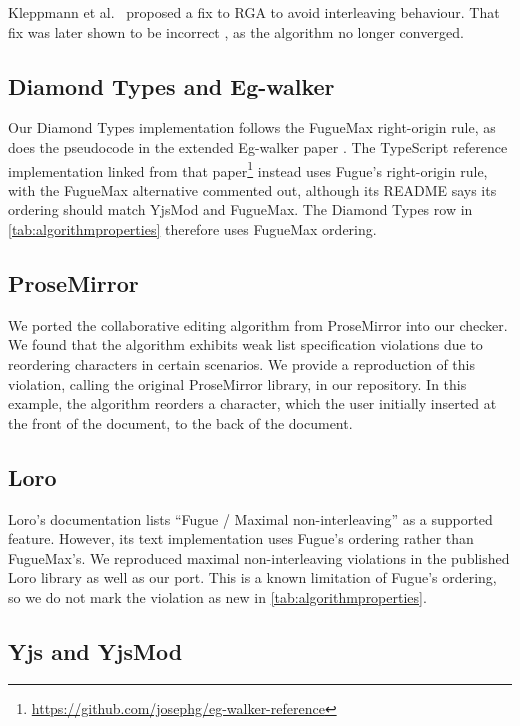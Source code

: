 \documentclass[sigplan,10pt,review,anonymous]{acmart}
\begin{document}
Kleppmann et al.~\cite{Kleppmann2019} proposed a fix to RGA to avoid interleaving behaviour. That fix was later shown to be incorrect \cite{Weidner2025Fugue}, as the algorithm no longer converged.

\subsection{Diamond Types and Eg-walker}

Our Diamond Types implementation follows the FugueMax right-origin rule, as does the pseudocode in the extended Eg-walker paper \cite{Gentle2025}. The TypeScript reference implementation linked from that paper\footnote{\url{https://github.com/josephg/eg-walker-reference}} instead uses Fugue's right-origin rule, with the FugueMax alternative commented out, although its README says its ordering should match YjsMod and FugueMax. The Diamond Types row in \autoref{tab:algorithmproperties} therefore uses FugueMax ordering.

\subsection{ProseMirror}

We ported the collaborative editing algorithm from ProseMirror \cite{Haverbeke2015} into our checker. We found that the algorithm exhibits weak list specification violations due to reordering characters in certain scenarios. We provide a reproduction of this violation, calling the original ProseMirror library, in our repository. In this example, the algorithm reorders a character, which the user initially inserted at the front of the document, to the back of the document.

\subsection{Loro} \label{sec:loroimplementation}

Loro's documentation \cite{Loro2026} lists ``Fugue / Maximal non-inter\-leaving'' as a supported feature. However, its text implementation uses Fugue's ordering rather than FugueMax's. We reproduced maximal non-interleaving violations in the published Loro library as well as our port. This is a known limitation of Fugue's ordering, so we do not mark the violation as new in \autoref{tab:algorithmproperties}.

\subsection{Yjs and YjsMod}
\end{document}

